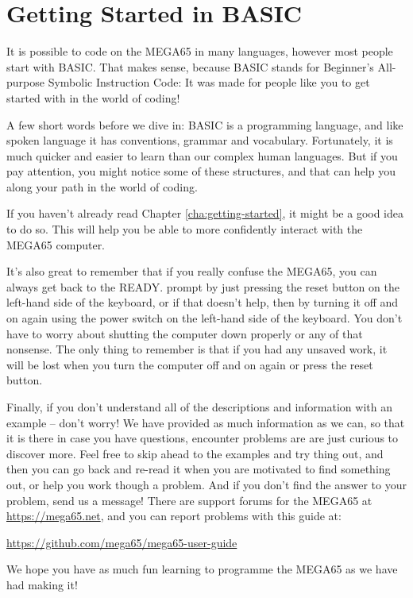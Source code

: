 \chapter{Getting Started in BASIC}
\label{cha:basic-getting-started}

It is possible to code on the MEGA65 in many languages,
however most people start with BASIC.  That makes sense,
because BASIC stands for Beginner's All-purpose Symbolic
Instruction Code: It was made for people like you to get
started with in the world of coding!

A few short words before we dive in: BASIC is a programming
language, and like spoken language it has conventions, grammar
and vocabulary.  Fortunately, it is much quicker and easier
to learn than our complex human languages. But if you pay
attention, you might notice some of these structures, and that
can help you along your path in the world of coding.

If you haven't already read Chapter \ref{cha:getting-started},
it might be a good idea to do so. This will help you be able to
more confidently interact with the MEGA65 computer.

It's also great to remember that if you really confuse the MEGA65,
you can always get back to the READY. prompt by just pressing the
reset button on the left-hand side of the keyboard, or if that
doesn't help, then by turning it off
and on again using the power switch on the left-hand side of the keyboard.
You don't have to worry about shutting the computer
down properly or any of that nonsense.  The only thing to remember
is that if you had any unsaved work, it will be lost when you turn
the computer off and on again or press the reset button.

Finally, if you don't understand all of the descriptions and information
with an example -- don't worry! We have provided as much information
as we can, so that it is there in case you have questions, encounter problems are are
just curious to discover more.  Feel free to skip ahead to the examples
and try thing out, and then you can go back and re-read it when you are motivated
to find something out, or help you work though a problem.  And if you don't find
the answer to your problem, send us a message!  There are support forums for the
MEGA65 at \url{https://mega65.net}, and you can
report problems with this guide at:

\url{https://github.com/mega65/mega65-user-guide}

We hope you have as much fun learning to programme the MEGA65 as
we have had making it!


